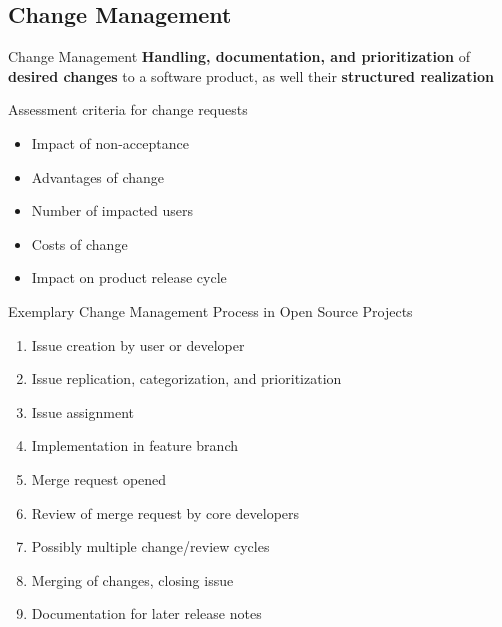 \subsection{Change Management}
\begin{frame}{\insertsubsection  \mytitlesource{\sommerville}}
	\begin{fancycolumns}[animation=none]
		\begin{definition}{Change Management}
			\textbf{Handling, documentation, and prioritization} of \textbf{desired changes} to a software product, as well their \textbf{structured  realization}
		\end{definition}\pause
		
		\begin{note}{Assessment criteria for change requests}
			\begin{itemize}
				\item Impact of non-acceptance
				\item Advantages of change
				\item Number of impacted users
				\item Costs of change
				\item Impact on product release cycle
			\end{itemize}
		\end{note} \pause
		\nextcolumn
		\begin{note}{Exemplary Change Management Process in Open Source Projects}
			\begin{enumerate}[<+->]
				\item Issue creation by user or developer
				\item Issue replication, categorization, and prioritization
				\item Issue assignment
				\item Implementation in feature branch
				\item Merge request opened
				\item Review of merge request by core developers
				\item Possibly multiple change/review cycles
				\item Merging of changes, closing issue
				\item Documentation for later release notes
			\end{enumerate}
		\end{note}
	\end{fancycolumns}
\end{frame}

